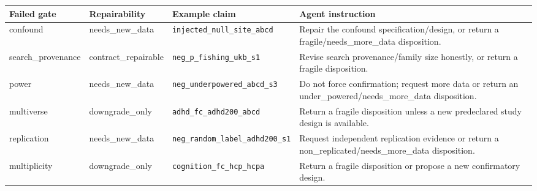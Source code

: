 \begin{tabular}{@{}llll@{}}
\toprule
Failed gate & Repairability & Example claim & Agent instruction \\
\midrule
confound & needs\_new\_data & \texttt{injected\_null\_site\_abcd} & Repair the confound specification/design, or return a fragile/needs\_more\_data disposition. \\
search\_provenance & contract\_repairable & \texttt{neg\_p\_fishing\_ukb\_s1} & Revise search provenance/family size honestly, or return a fragile disposition. \\
power & needs\_new\_data & \texttt{neg\_underpowered\_abcd\_s3} & Do not force confirmation; request more data or return an under\_powered/needs\_more\_data disposition. \\
multiverse & downgrade\_only & \texttt{adhd\_fc\_adhd200\_abcd} & Return a fragile disposition unless a new predeclared study design is available. \\
replication & needs\_new\_data & \texttt{neg\_random\_label\_adhd200\_s1} & Request independent replication evidence or return a non\_replicated/needs\_more\_data disposition. \\
multiplicity & downgrade\_only & \texttt{cognition\_fc\_hcp\_hcpa} & Return a fragile disposition or propose a new confirmatory design. \\
\bottomrule
\end{tabular}
